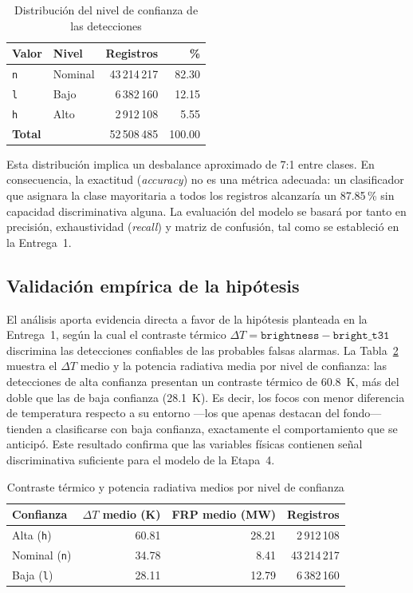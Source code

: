 \documentclass[conference]{IEEEtran}
\begin{document}
\begin{table}[t]
\caption{Distribución del nivel de confianza de las detecciones}
\label{tab:confianza}
\centering
\renewcommand{\arraystretch}{1.25}
\begin{tabular}{l l r r}
\toprule
\textbf{Valor} & \textbf{Nivel} & \textbf{Registros} & \textbf{\%} \\
\midrule
\texttt{n} & Nominal & 43\,214\,217 & 82.30 \\
\texttt{l} & Bajo & 6\,382\,160 & 12.15 \\
\texttt{h} & Alto & 2\,912\,108 & 5.55 \\
\midrule
\multicolumn{2}{l}{\textbf{Total}} & 52\,508\,485 & 100.00 \\
\bottomrule
\end{tabular}
\end{table}

Esta distribución implica un desbalance aproximado de 7:1 entre clases. En consecuencia, la exactitud (\textit{accuracy}) no es una métrica adecuada: un clasificador que asignara la clase mayoritaria a todos los registros alcanzaría un 87.85\,\% sin capacidad discriminativa alguna. La evaluación del modelo se basará por tanto en precisión, exhaustividad (\textit{recall}) y matriz de confusión, tal como se estableció en la Entrega~1.

\subsection{Validación empírica de la hipótesis}
El análisis aporta evidencia directa a favor de la hipótesis planteada en la Entrega~1, según la cual el contraste térmico $\Delta T = \texttt{brightness} - \texttt{bright\_t31}$ discrimina las detecciones confiables de las probables falsas alarmas. La Tabla~\ref{tab:deltat} muestra el $\Delta T$ medio y la potencia radiativa media por nivel de confianza: las detecciones de alta confianza presentan un contraste térmico de 60.8~K, más del doble que las de baja confianza (28.1~K). Es decir, los focos con menor diferencia de temperatura respecto a su entorno —los que apenas destacan del fondo— tienden a clasificarse con baja confianza, exactamente el comportamiento que se anticipó. Este resultado confirma que las variables físicas contienen señal discriminativa suficiente para el modelo de la Etapa~4.

\begin{table}[t]
\caption{Contraste térmico y potencia radiativa medios por nivel de confianza}
\label{tab:deltat}
\centering
\renewcommand{\arraystretch}{1.25}
\begin{tabular}{l r r r}
\toprule
\textbf{Confianza} & \textbf{$\Delta T$ medio (K)} & \textbf{FRP medio (MW)} & \textbf{Registros} \\
\midrule
Alta (\texttt{h})    & 60.81 & 28.21 & 2\,912\,108 \\
Nominal (\texttt{n}) & 34.78 &  8.41 & 43\,214\,217 \\
Baja (\texttt{l})    & 28.11 & 12.79 & 6\,382\,160 \\
\bottomrule
\end{tabular}
\end{table}
\end{document}
